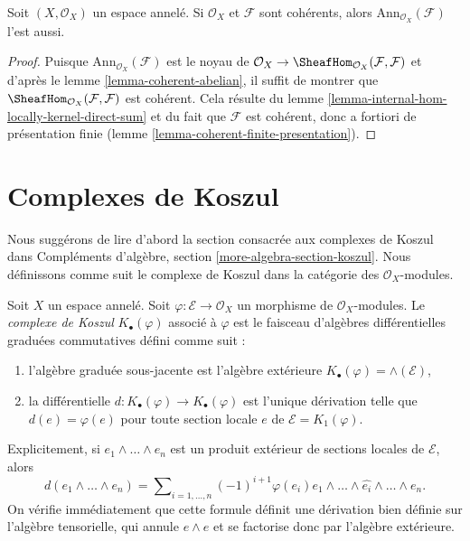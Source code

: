 \begin{lemma}
\label{lemma-coherent-annihilator}
Soit $(X,\mathcal{O}_X)$ un espace annelé.
Si $\mathcal{O}_X$ et $\mathcal{F}$ sont cohérents,
alors $\text{Ann}_{\mathcal{O}_X}(\mathcal{F})$ l'est aussi.
\end{lemma}

\begin{proof}
Puisque $\text{Ann}_{\mathcal{O}_X}(\mathcal{F})$ est le noyau de
$\mathcal{O}_X \to \SheafHom_{\mathcal{O}_X}(\mathcal{F}, \mathcal{F})$
et d'après le lemme \ref{lemma-coherent-abelian}, il suffit
de montrer que $\SheafHom_{\mathcal{O}_X}(\mathcal{F}, \mathcal{F})$ est
cohérent. Cela résulte du
lemme \ref{lemma-internal-hom-locally-kernel-direct-sum}
et du fait que $\mathcal{F}$ est cohérent, donc a fortiori de présentation finie
(lemme \ref{lemma-coherent-finite-presentation}).
\end{proof}





\section{Complexes de Koszul}
\label{section-koszul-complex}

\noindent
Nous suggérons de lire d'abord la section consacrée aux complexes de Koszul dans
Compléments d'algèbre, section \ref{more-algebra-section-koszul}.
Nous définissons comme suit le complexe de Koszul dans la catégorie des
$\mathcal{O}_X$-modules.

\begin{definition}
\label{definition-koszul}
Soit $X$ un espace annelé. Soit $\varphi : \mathcal{E} \to \mathcal{O}_X$
un morphisme de $\mathcal{O}_X$-modules. Le
{\it complexe de Koszul} $K_\bullet(\varphi)$ associé à $\varphi$
est le faisceau d'algèbres différentielles graduées commutatives défini comme suit :
\begin{enumerate}
\item l'algèbre graduée sous-jacente est l'algèbre extérieure
$K_\bullet(\varphi) = \wedge(\mathcal{E})$,
\item la différentielle $d : K_\bullet(\varphi) \to K_\bullet(\varphi)$
est l'unique dérivation telle que $d(e) = \varphi(e)$ pour toute
section locale $e$ de $\mathcal{E} = K_1(\varphi)$.
\end{enumerate}
\end{definition}

\noindent
Explicitement, si $e_1 \wedge \ldots \wedge e_n$ est un produit extérieur de
sections locales de $\mathcal{E}$, alors
$$
d(e_1 \wedge \ldots \wedge e_n) =
\sum\nolimits_{i = 1, \ldots, n} (-1)^{i + 1}
\varphi(e_i)e_1 \wedge \ldots \wedge \widehat{e_i} \wedge \ldots \wedge e_n.
$$
On vérifie immédiatement que cette formule définit une dérivation bien définie
sur l'algèbre tensorielle, qui annule $e \wedge e$ et se factorise donc
par l'algèbre extérieure.

